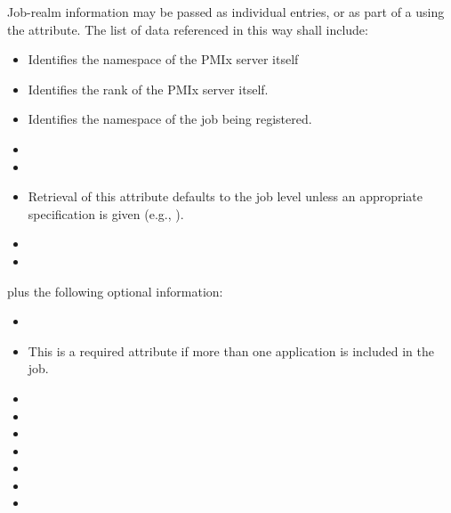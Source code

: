 Job-realm information may be passed as individual  entries, or as part of a  using the  attribute. The list of data referenced in this way shall include:

\begin{itemize}
    \item {}Identifies the namespace of the \ac{PMIx} server itself
    \pasteAttributeItemEnd
    \item {}Identifies the rank of the \ac{PMIx} server itself.
    \pasteAttributeItemEnd
    \item {}Identifies the namespace of the job being registered.
    \pasteAttributeItemEnd
    \item {}
    \item {}
    \item {}Retrieval of this attribute defaults to the job level unless an appropriate specification is given (e.g., ).
    \pasteAttributeItemEnd
    \item {}
    \item {}
\end{itemize}

plus the following optional information:

\begin{itemize}
    \item {}
    \item {}This is a required attribute if more than one application is included in the job.
    \pasteAttributeItemEnd
    \item {}
    \item {}
    \item {}
    \item {}
    \item {}
    \item {}
    \item {}
\end{itemize}

